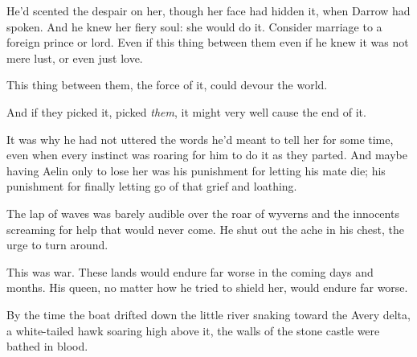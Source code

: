 He'd scented the despair on her, though her face had hidden it, when Darrow had spoken. And he knew her fiery soul: she would do it. Consider marriage to a foreign prince or lord. Even if this thing between them
 even if he knew it was not mere lust, or even just love.

This thing between them, the force of it, could devour the world.

And if they picked it, picked \emph{them}, it might very well cause the end of it.

It was why he had not uttered the words he'd meant to tell her for some time, even when every instinct was roaring for him to do it as they parted. And maybe having Aelin only to lose her was his punishment for letting his mate die; his punishment for finally letting go of that grief and loathing.

The lap of waves was barely audible over the roar of wyverns and the innocents screaming for help that would never come. He shut out the ache in his chest, the urge to turn around.

This was war. These lands would endure far worse in the coming days and months. His queen, no matter how he tried to shield her, would endure far worse.

By the time the boat drifted down the little river snaking toward the Avery delta, a white-tailed hawk soaring high above it, the walls of the stone castle were bathed in blood.
